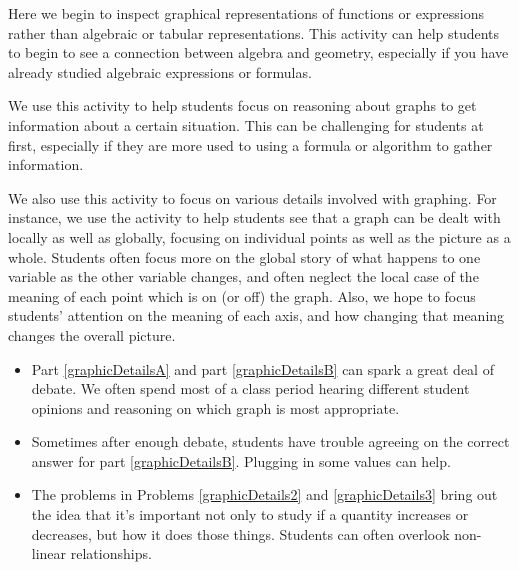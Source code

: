 \documentclass{ximera}
\begin{document}
\newpage

\begin{instructorNotes}
Here we begin to inspect graphical representations of functions or expressions rather than algebraic or tabular representations.  This activity can help students to begin to see a connection between algebra and geometry, especially if you have already studied algebraic expressions or formulas.

We use this activity to help students focus on reasoning about graphs to get information about a certain situation.  This can be challenging for students at first, especially if they are more used to using a formula or algorithm to gather information.

We also use this activity to focus on various details involved with graphing.  For instance, we use the activity to help students see that a graph can be dealt with locally as well as globally, focusing on individual points as well as the picture as a whole.  Students often focus more on the global story of what happens to one variable as the other variable changes, and often neglect the local case of the meaning of each point which is on (or off) the graph.  Also, we hope to focus students' attention on the meaning of each axis, and how changing that meaning changes the overall picture.



\begin{itemize}
    \item Part \ref{graphicDetailsA} and part \ref{graphicDetailsB} can spark a great deal of debate.  We often spend most of a class period hearing different student opinions and reasoning on which graph is most appropriate.
    \item Sometimes after enough debate, students have trouble agreeing on the correct answer for part \ref{graphicDetailsB}.  Plugging in some values can help.
    \item The problems in Problems \ref{graphicDetails2} and \ref{graphicDetails3} bring out the idea that it's important not only to study if a quantity increases or decreases, but how it does those things.  Students can often overlook non-linear relationships.
\end{itemize}








\end{instructorNotes}
\end{document}
